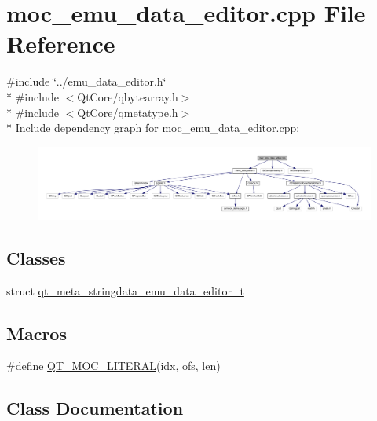 \hypertarget{a00065}{\section{moc\+\_\+emu\+\_\+data\+\_\+editor.\+cpp File Reference}
\label{a00065}
}
{\ttfamily \#include \char`\"{}../emu\+\_\+data\+\_\+editor.\+h\char`\"{}}\\*
{\ttfamily \#include $<$Qt\+Core/qbytearray.\+h$>$}\\*
{\ttfamily \#include $<$Qt\+Core/qmetatype.\+h$>$}\\*
Include dependency graph for moc\+\_\+emu\+\_\+data\+\_\+editor.\+cpp\+:
\nopagebreak
\begin{figure}[H]
\begin{center}
\leavevmode
\includegraphics[width=350pt]{db/dc3/a00284}
\end{center}
\end{figure}
\subsection*{Classes}
\begin{DoxyCompactItemize}
\item 
struct \hyperlink{a00065_da/d15/a00188}{qt\+\_\+meta\+\_\+stringdata\+\_\+emu\+\_\+data\+\_\+editor\+\_\+t}
\end{DoxyCompactItemize}
\subsection*{Macros}
\begin{DoxyCompactItemize}
\item 
\#define \hyperlink{a00065_a75bb9482d242cde0a06c9dbdc6b83abe}{Q\+T\+\_\+\+M\+O\+C\+\_\+\+L\+I\+T\+E\+R\+A\+L}(idx, ofs, len)
\end{DoxyCompactItemize}


\subsection{Class Documentation}
\label{da/d15/a00188}
\hypertarget{a00065_da/d15/a00188}{}
